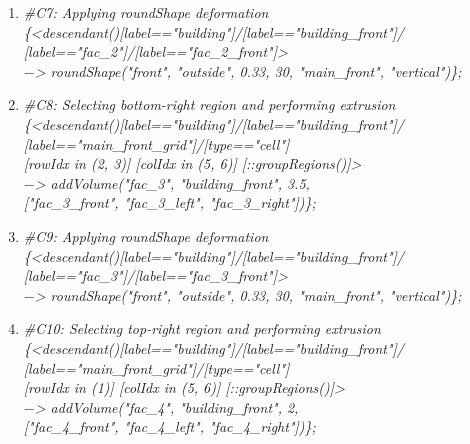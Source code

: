 \begin{enumerate}[label=(\alph*)]
    \item \textit{\#C7: Applying roundShape deformation} \\
            \qquad \textit{\{<descendant()[label=="building"]/[label=="building\_front"]/} \\
            \qquad \textit{[label=="fac\_2"]/[label=="fac\_2\_front"]>} \\
            \qquad \textit{$-$> roundShape("front", "outside", 0.33, 30, "main\_front", "vertical")\};}
    
    \item \textit{\#C8: Selecting bottom-right region and performing extrusion} \\
            \qquad \textit{\{<descendant()[label=="building"]/[label=="building\_front"]/} \\
            \qquad \textit{[label=="main\_front\_grid"]/[type=="cell"]} \\
            \qquad \textit{[rowIdx in (2, 3)] [colIdx in (5, 6)] [::groupRegions()]>} \\
            \qquad \textit{$-$> addVolume("fac\_3", "building\_front", 3.5,} \\
            \qquad \textit{["fac\_3\_front", "fac\_3\_left", "fac\_3\_right"])\};}
            
    \item \textit{\#C9: Applying roundShape deformation} \\
            \qquad \textit{\{<descendant()[label=="building"]/[label=="building\_front"]/} \\
            \qquad \textit{[label=="fac\_3"]/[label=="fac\_3\_front"]>} \\
            \qquad \textit{$-$> roundShape("front", "outside", 0.33, 30, "main\_front", "vertical")\};}
            
    \item \textit{\#C10: Selecting top-right region and performing extrusion} \\
            \qquad \textit{\{<descendant()[label=="building"]/[label=="building\_front"]/} \\
            \qquad \textit{[label=="main\_front\_grid"]/[type=="cell"]} \\
            \qquad \textit{[rowIdx in (1)] [colIdx in (5, 6)] [::groupRegions()]>} \\
            \qquad \textit{$-$> addVolume("fac\_4", "building\_front", 2,} \\
            \qquad \textit{["fac\_4\_front", "fac\_4\_left", "fac\_4\_right"])\};}
    

\end{enumerate}
